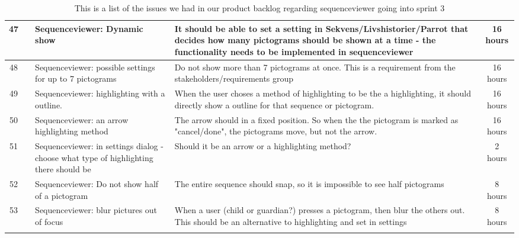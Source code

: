 \begin{longtable} { | c | c | p{5cm} | p{5cm} | c | } 
\hline
	47	&		 &	Sequenceviewer: Dynamic show	 &		It should be able to set a setting in Sekvens/Livshistorier/Parrot that decides how many pictograms should be shown at a time - the functionality needs to be implemented in sequenceviewer	 &	16 hours \\\hline
	48	&		 &	Sequenceviewer: possible settings for up to 7 pictograms		 &		Do not show more than 7 pictograms at once. This is a requirement from the stakeholders/requirements group			 & 	16 hours	\\\hline
	49	&		 &	Sequenceviewer: highlighting with a outline.	 &	When the user choses a method of highlighting to be the a highlighting, it should directly show a outline for that sequence or pictogram.			 &	16 hours \\\hline
	50	&		 &	Sequenceviewer: an arrow highlighting method	 &	The arrow should in a fixed position. So when the the pictogram is marked as "cancel/done", the pictograms move, but not the arrow.				 &	16 hours \\\hline
	51	&		 &	Sequenceviewer: in settings dialog - choose what type of highlighting there should be		 &	Should it be an arrow or a highlighting method?	 &	2 hours \\\hline
	52	&		 &	Sequenceviewer: Do not show half of a pictogram		 & 	The entire sequence should snap, so it is impossible to see half pictograms	 &	8 hours	\\\hline
	53	&		 &	Sequenceviewer: blur pictures out of focus		 &	When a user (child or guardian?) presses a pictogram, then blur the others out. This should be an alternative to highlighting and set in settings			 &	8 hours \\\hline
\caption{This is a list of the issues we had in our product backlog regarding sequenceviewer going into sprint 3}
\label{tab:spr3_sw_prodblog}
\end{longtable}

